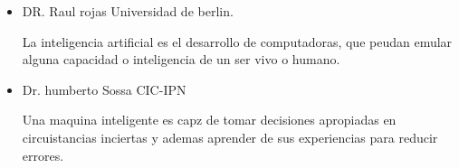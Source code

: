 \begin{itemize}
    \item DR. Raul rojas Universidad de berlin.\par 
    La inteligencia artificial es el desarrollo de computadoras, que peudan emular alguna capacidad o inteligencia de un ser vivo o humano.
    \item Dr. humberto Sossa CIC-IPN\par
    Una maquina inteligente es capz de tomar decisiones apropiadas en circuistancias inciertas y ademas aprender de sus experiencias para reducir errores. 
\end{itemize}